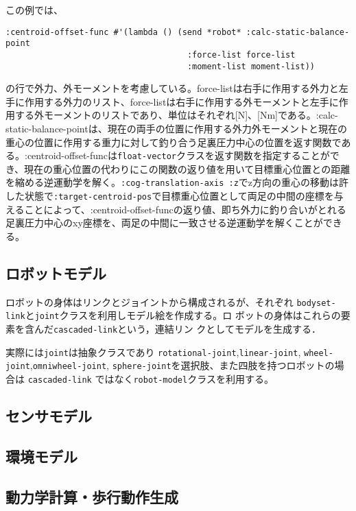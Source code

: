 この例では、
{\baselineskip=10pt
\begin{verbatim}
:centroid-offset-func #'(lambda () (send *robot* :calc-static-balance-point
                                     :force-list force-list
                                     :moment-list moment-list))
\end{verbatim}
}
の行で外力、外モーメントを考慮している。force-listは右手に作用する外力と左手に作用する外力のリスト、force-listは右手に作用する外モーメントと左手に作用する外モーメントのリストであり、単位はそれぞれ[N]、[Nm]である。:calc-static-balance-pointは、現在の両手の位置に作用する外力外モーメントと現在の重心の位置に作用する重力に対して釣り合う足裏圧力中心の位置を返す関数である。:centroid-offset-funcは\verb|float-vector|クラスを返す関数を指定することができ、現在の重心位置の代わりにこの関数の返り値を用いて目標重心位置との距離を縮める逆運動学を解く。\verb|:cog-translation-axis :z|でz方向の重心の移動は許した状態で\verb|:target-centroid-pos|で目標重心位置として両足の中間の座標を与えることによって、:centroid-offset-funcの返り値、即ち外力に釣り合いがとれる足裏圧力中心のxy座標を、両足の中間に一致させる逆運動学を解くことができる。

 \subsection{ロボットモデル}

ロボットの身体はリンクとジョイントから構成されるが、それぞれ
\verb|bodyset-link|と\verb|joint|クラスを利用しモデル絵を作成する。ロ
ボットの身体はこれらの要素を含んだ\verb|cascaded-link|という，連結リン
クとしてモデルを生成する．

実際には\verb|joint|は抽象クラスであり
\verb|rotational-joint|,\verb|linear-joint|,
\verb|wheel-joint|,\verb|omniwheel-joint|,
\verb|sphere-joint|を選択肢、また四肢を持つロボットの場合は
\verb|cascaded-link|
ではなく\verb|robot-model|クラスを利用する。

  
  
  
 \subsection{センサモデル}
  
 \subsection{環境モデル}
  
 \subsection{動力学計算・歩行動作生成}
  
